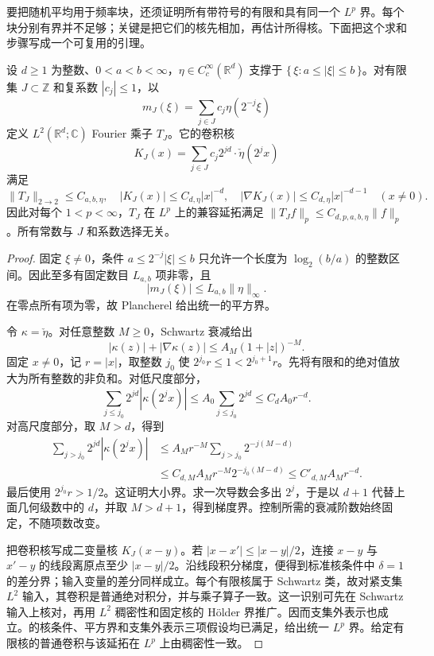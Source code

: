 要把随机平均用于频率块，还须证明所有带符号的有限和具有同一个 \(L^p\) 界。每个块分别有界并不足够；关键是把它们的核先相加，再估计所得核。下面把这个求和步骤写成一个可复用的引理。

\begin{lemma}[二进核的统一估计]\label{b2:lem:19-uniform-dyadic-kernels}
设 \(d\geq1\) 为整数、\(0<a<b<\infty\)，\(\eta\in C_c^\infty(\mathbb R^d)\) 支撑于 \(\{\,\xi:a\leq|\xi|\leq b\,\}\)。对有限集 \(J\subset\mathbb Z\) 和复系数 \(|c_j|\leq1\)，以
\[
 m_J(\xi)=\sum_{j\in J}c_j\eta(2^{-j}\xi)
\]
定义 \(L^2(\mathbb R^d;\mathbb C)\) Fourier 乘子 \(T_J\)。它的卷积核
\[
 K_J(x)=\sum_{j\in J}c_j2^{jd}\cdot\check\eta(2^jx)
\]
满足
\[
 \|T_J\|_{2\to2}\leq C_{a,b,\eta},\quad
 |K_J(x)|\leq C_{d,\eta}|x|^{-d},\quad
 |\nabla K_J(x)|\leq C_{d,\eta}|x|^{-d-1}
 \quad(x\ne0).
\]
因此对每个 \(1<p<\infty\)，\(T_J\) 在 \(L^p\) 上的兼容延拓满足
\(\|T_Jf\|_p\leq C_{d,p,a,b,\eta}\|f\|_p\)。所有常数与 \(J\) 和系数选择无关。
\end{lemma}
\begin{proof}
固定 \(\xi\ne0\)，条件 \(a\leq2^{-j}|\xi|\leq b\) 只允许一个长度为 \(\log_2(b/a)\) 的整数区间。因此至多有固定数目 \(L_{a,b}\) 项非零，且
\[
 |m_J(\xi)|\leq L_{a,b}\|\eta\|_\infty.
\]
在零点所有项为零，故 Plancherel 给出统一的平方界。

令 \(\kappa=\check\eta\)。对任意整数 \(M\geq0\)，Schwartz 衰减给出
\[
 |\kappa(z)|+|\nabla\kappa(z)|
 \leq A_M(1+|z|)^{-M}.
\]
固定 \(x\ne0\)，记 \(r=|x|\)，取整数 \(j_0\) 使 \(2^{j_0}r\leq1<2^{j_0+1}r\)。先将有限和的绝对值放大为所有整数的非负和。对低尺度部分，
\[
 \sum_{j\leq j_0}2^{jd}|\kappa(2^jx)|
 \leq A_0\sum_{j\leq j_0}2^{jd}
 \leq C_dA_0r^{-d}.
\]
对高尺度部分，取 \(M>d\)，得到
\[
 \begin{aligned}
 \sum_{j>j_0}2^{jd}|\kappa(2^jx)|
 &\leq A_Mr^{-M}\sum_{j>j_0}2^{-j(M-d)}\\
 &\leq C_{d,M}A_Mr^{-M}2^{-j_0(M-d)}
 \leq C'_{d,M}A_Mr^{-d}.
 \end{aligned}
\]
最后使用 \(2^{j_0}r>1/2\)。这证明大小界。求一次导数会多出 \(2^j\)，于是以 \(d+1\) 代替上面几何级数中的 \(d\)，并取 \(M>d+1\)，得到梯度界。控制所需的衰减阶数始终固定，不随项数改变。

把卷积核写成二变量核 \(K_J(x-y)\)。若 \(|x-x'|\leq|x-y|/2\)，连接 \(x-y\) 与 \(x'-y\) 的线段离原点至少 \(|x-y|/2\)。沿线段积分梯度，便得到标准核条件中 \(\delta=1\) 的差分界；输入变量的差分同样成立。每个有限核属于 Schwartz 类，故对紧支集 \(L^2\) 输入，其卷积是普通绝对积分，并与乘子算子一致。这一识别可先在 Schwartz 输入上核对，再用 \(L^2\) 稠密性和固定核的 Hölder 界推广。因而支集外表示也成立。的核条件、平方界和支集外表示三项假设均已满足，给出统一 \(L^p\) 界。给定有限核的普通卷积与该延拓在 \(L^p\) 上由稠密性一致。
\end{proof}

